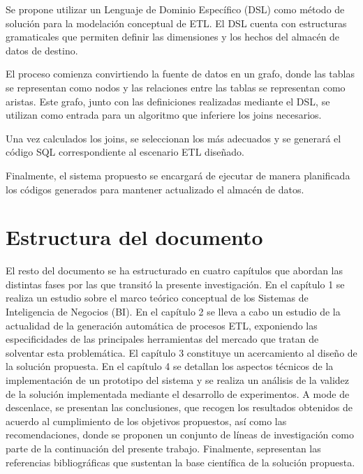Se propone utilizar un Lenguaje de Dominio Específico (DSL) como método de solución para la modelación conceptual de ETL. 
El DSL cuenta con estructuras gramaticales que permiten definir las dimensiones y los hechos del almacén de datos de 
destino.

El proceso comienza convirtiendo la fuente de datos en un grafo, donde las tablas se representan como nodos y las relaciones 
entre las tablas se representan como aristas. Este grafo, junto con las definiciones realizadas mediante el DSL, se utilizan 
como entrada para un algoritmo que inferiere los joins necesarios.

Una vez calculados los joins, se seleccionan los más adecuados y se generará el 
código SQL correspondiente al escenario ETL diseñado.

Finalmente, el sistema propuesto se encargará de ejecutar de manera planificada los códigos generados para mantener actualizado 
el almacén de datos. 

\section{Estructura del documento}

El resto del documento se ha estructurado en cuatro capítulos que abordan las distintas fases por las que transitó la 
presente investigación. En el cap\'itulo 1 se realiza un estudio sobre el marco te\'orico conceptual de los Sistemas de 
Inteligencia de Negocios (BI). En el cap\'itulo 2 se lleva a cabo un estudio de la actualidad de la generaci\'on autom\'atica 
de procesos ETL, exponiendo las especificidades de las principales herramientas del mercado que tratan de solventar esta 
problem\'atica. El cap\'itulo 3 constituye un acercamiento al diseño de la soluci\'on propuesta. En el capítulo 4 se 
detallan los aspectos técnicos de la implementación de un prototipo del sistema y se realiza un análisis de la validez de 
la solución implementada mediante el desarrollo de experimentos. A mode de descenlace, se presentan las conclusiones,
que recogen los resultados obtenidos de acuerdo al cumplimiento de los objetivos propuestos, así como las recomendaciones, 
donde se proponen un conjunto de líneas de investigación como parte de la continuación del presente trabajo. Finalmente, 
sepresentan las referencias bibliográficas que sustentan la base científica de la solución propuesta.